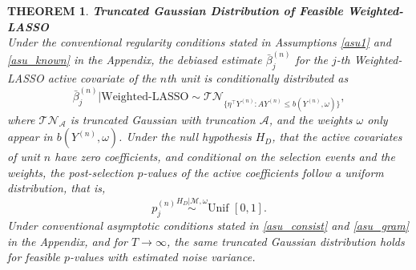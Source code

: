 \documentclass[11pt]{article}
\newtheorem{theorem}{THEOREM}
\def\cmt#1{{\textcolor{red}{(#1)}}}
\begin{document}
	
	
	
	\begin{theorem}{\bf Truncated Gaussian Distribution of Feasible Weighted-LASSO}\label{thm1_main}\\
		Under the conventional regularity conditions stated in Assumptions \ref{asu1} and \ref{asu_known} in the Appendix, the debiased estimate $\bar{\beta}_j^{(n)}$ for the $j$-th Weighted-LASSO active covariate of the $n$th unit is conditionally distributed as
		\begin{equation}\label{eq:thm1_formula}
			\bar{\beta}_{j}^{(n)}|\textrm{Weighted-LASSO}			\sim \mathcal{TN}_{\{\eta^\top Y^{(n)}:AY^{(n)}\leq b(Y^{(n)},\omega)\}},
		\end{equation}
		where $\mathcal{TN}_{\mathcal{A}}$ is truncated Gaussian with truncation $\mathcal{A}$, and the weights $\omega$ only appear in $b(Y^{(n)},\omega)$. 
  Under the null hypothesis $H_D$, that the active covariates of unit $n$ have zero coefficients, and conditional on the selection events and the weights, the post-selection $p$-values of the active coefficients follow a uniform distribution, that is, 
		$$p^{(n)}_j \stackrel{H_D|\mathcal{M},\omega}{\sim} \textrm{Unif }[0,1].$$
  Under conventional asymptotic conditions stated in \ref{asu_consist} and \ref{asu_gram} in the Appendix, and for $T\rightarrow \infty$, the same truncated Gaussian distribution holds for feasible $p$-values with estimated noise variance. 
  	\end{theorem}
	
\end{document}
